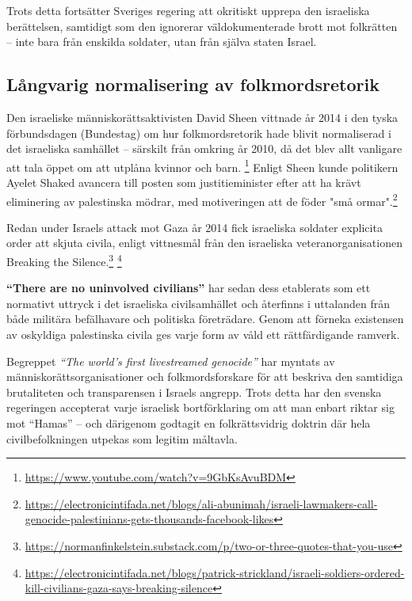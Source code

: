 \documentclass[12pt]{article}
\begin{document}
Trots detta fortsätter Sveriges regering att okritiskt upprepa den israeliska berättelsen, samtidigt som den ignorerar väldokumenterade brott mot folkrätten – inte bara från enskilda soldater, utan från själva staten Israel.


\subsection{Långvarig normalisering av folkmordsretorik}

Den israeliske människorättsaktivisten David Sheen vittnade år 2014 i den tyska förbundsdagen (Bundestag) om hur folkmordsretorik hade blivit normaliserad i det israeliska samhället – särskilt från omkring år 2010, då det blev allt vanligare att tala öppet om att utplåna kvinnor och barn. \footnote{\url{https://www.youtube.com/watch?v=9GbKsAvuBDM}} Enligt Sheen kunde politikern Ayelet Shaked avancera till posten som justitieminister efter att ha krävt eliminering av palestinska mödrar, med motiveringen att de föder "små ormar".\footnote{\url{https://electronicintifada.net/blogs/ali-abunimah/israeli-lawmakers-call-genocide-palestinians-gets-thousands-facebook-likes}}

Redan under Israels attack mot Gaza år 2014 fick israeliska soldater explicita order att skjuta civila, enligt vittnesmål från den israeliska veteranorganisationen Breaking the Silence.\footnote{\url{https://normanfinkelstein.substack.com/p/two-or-three-quotes-that-you-use}} \footnote{\url{https://electronicintifada.net/blogs/patrick-strickland/israeli-soldiers-ordered-kill-civilians-gaza-says-breaking-silence}}

\textbf{“There are no uninvolved civilians”} har sedan dess etablerats som ett normativt uttryck i det israeliska civilsamhället och återfinns i uttalanden från både militära befälhavare och politiska företrädare. Genom att förneka existensen av oskyldiga palestinska civila ges varje form av våld ett rättfärdigande ramverk.

Begreppet \textit{“The world’s first livestreamed genocide”} har myntats av människorättsorganisationer och folkmordsforskare för att beskriva den samtidiga brutaliteten och transparensen i Israels angrepp. Trots detta har den svenska regeringen accepterat varje israelisk bortförklaring om att man enbart riktar sig mot \enquote{Hamas} – och därigenom godtagit en folkrättsvidrig doktrin där hela civilbefolkningen utpekas som legitim måltavla.
\end{document}
